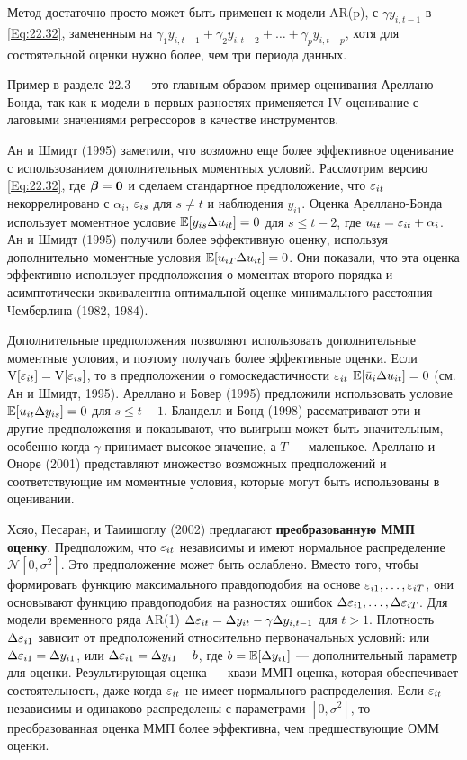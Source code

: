 Метод достаточно просто может быть применен к модели AR(p), с $\gamma y_{i,t-1}$ в \ref{Eq:22.32}, замененным на $\gamma_1 y_{i,t-1}+\gamma_2 y_{i,t-2}+ \dots + \gamma_p y_{i,t-p}$, хотя для состоятельной оценки нужно более, чем три периода данных.

Пример в разделе 22.3 --- это главным образом  пример  оценивания Ареллано-Бонда, так как  к модели в первых разностях применяется IV оценивание с лаговыми значениями регрессоров в качестве инструментов.

Ан и Шмидт (1995) заметили, что возможно еще более эффективное оценивание с использованием дополнительных моментных условий. Рассмотрим версию \ref{Eq:22.32}, где $\bm{\beta}= \mathbf 0$ и сделаем стандартное предположение, что $\varepsilon_{it}$ некоррелировано с $\alpha_i$, $\varepsilon_{is}$ для $s \neq t$ и наблюдения $y_{i1}$. Оценка Ареллано-Бонда  использует моментное условие $\mathbb{E}[y_{is} \Delta u_{it}]=0$ для $s \leq t-2$, где  $u_{it}=\varepsilon_{it}+\alpha_i$. Ан и Шмидт (1995) получили более эффективную оценку, используя дополнительно моментные условия $\mathbb{E}[u_{iT}\Delta u_{it}]=0$. Они показали, что эта оценка эффективно использует предположения о моментах второго порядка и асимптотически эквивалентна оптимальной оценке  минимального расстояния Чемберлина (1982, 1984).

Дополнительные предположения позволяют использовать дополнительные моментные условия, и поэтому получать более эффективные оценки. Если $\mathrm V[\varepsilon_{it}]=\mathrm V[\varepsilon_{is}]$, то в предположении о гомоскедастичности $\varepsilon_{it}$ $\mathbb{E}[\bar{u}_i \Delta u_{it}]=0$ (см. Ан и Шмидт, 1995). Ареллано и Бовер (1995) предложили использовать условие $\mathbb{E}[u_{it} \Delta y_{is}]=0$  для $s \leq t-1$. Бланделл и Бонд (1998) рассматривают эти и другие предположения и показывают, что выигрыш может быть значительным, особенно когда $\gamma$ принимает высокое значение, а $T$ --- маленькое. Ареллано и Оноре (2001) представляют множество возможных предположений и соответствующие им моментные условия, которые могут быть использованы в оценивании.

Хсяо, Песаран, и Тамишоглу (2002) предлагают \textbf{преобразованную ММП оценку}. Предположим, что $\varepsilon_{it}$ независимы и имеют нормальное распределение $\mathcal N [0, \sigma^2]$. Это предположение может быть ослаблено. Вместо того, чтобы формировать функцию максимального правдоподобия на основе $\varepsilon_{i1}, \dots, \varepsilon_{iT}$, они основывают функцию правдоподобия на разностях ошибок $\Delta \varepsilon_{i1}, \dots, \Delta \varepsilon_{iT}$. Для модели временного ряда AR(1) $\Delta \varepsilon_{it}=\Delta y_{it}  - \gamma \Delta y_{i,t-1}$ для $t >1$. Плотность $\Delta \varepsilon_{i1}$ зависит от предположений относительно первоначальных условий: или $\Delta \varepsilon_{i1} = \Delta y_{i1}$, или $\Delta \varepsilon_{i1} = \Delta y_{i1}-b$, где $b=\mathbb{E}[\Delta y_{i1}]$ --- дополнительный параметр для оценки. Результирующая оценка --- квази-ММП оценка, которая обеспечивает состоятельность, даже когда $\varepsilon_{it}$ не имеет нормального распределения. Если  $\varepsilon_{it}$ независимы и одинаково распределены с параметрами $[0,\sigma^2]$, то преобразованная оценка ММП более эффективна, чем предшествующие ОММ оценки.


